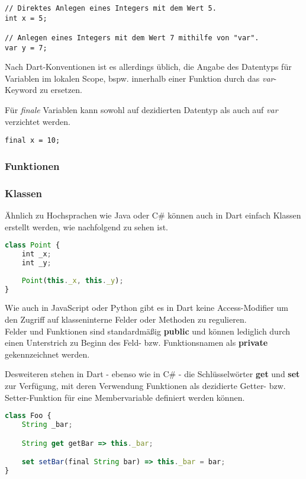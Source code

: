 \begin{lstlisting}
// Direktes Anlegen eines Integers mit dem Wert 5.
int x = 5;

// Anlegen eines Integers mit dem Wert 7 mithilfe von "var".
var y = 7;
\end{lstlisting}

Nach Dart-Konventionen ist es allerdings üblich, die Angabe des Datentyps für Variablen 
im lokalen Scope, bspw. innerhalb einer Funktion durch das \textit{var}-Keyword zu ersetzen.

Für \textit{finale} Variablen kann sowohl auf dezidierten Datentyp als auch auf \textit{var} 
verzichtet werden.

\begin{lstlisting}
final x = 10;
\end{lstlisting}

\subsubsection{Funktionen}



\subsubsection{Klassen}

Ähnlich zu Hochsprachen wie Java oder C\# können auch in Dart einfach Klassen
erstellt werden, wie nachfolgend zu sehen ist.

\pagebreak

\begin{lstlisting}[language=JavaScript]
class Point {
    int _x;
    int _y;
    
    Point(this._x, this._y);
}
\end{lstlisting}

Wie auch in JavaScript oder Python gibt es in Dart keine Access-Modifier um den Zugriff
auf klasseninterne Felder oder Methoden zu regulieren.\\
Felder und Funktionen sind standardmäßig \textbf{public} und können lediglich durch
einen Unterstrich zu Beginn des Feld- bzw. Funktionsnamen als \textbf{private} gekennzeichnet
werden.

Desweiteren stehen in Dart - ebenso wie in C\# - die Schlüsselwörter \textbf{get} und 
\textbf{set} zur Verfügung, mit deren Verwendung Funktionen als dezidierte Getter- bzw.
Setter-Funktion für eine Membervariable definiert werden können.

\begin{lstlisting}[language=JavaScript]
class Foo {
    String _bar;

    String get getBar => this._bar;

    set setBar(final String bar) => this._bar = bar;
}
\end{lstlisting}

